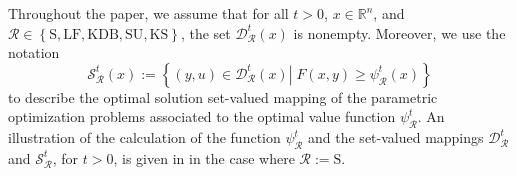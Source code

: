 Throughout the paper, we assume that for all $t>0$, $x\in \mathbb{R}^n$, and
$\mathcal{R}\in \left\{\mbox{S}, \mbox{LF}, \mbox{KDB}, \mbox{SU}, \mbox{KS}\right\}$, the set  $\mathcal{D}^{t}_{\mathcal{R}}(x)$ is nonempty. Moreover, we use the notation
\[
\mathcal{S}_{\mathcal{R}}^{t}(x):=\left\{  (y,u)\in\mathcal{D}^{t}_{\mathcal{R}}(x)\left\vert
\;F(x,y)\geq\psi_{\mathcal{R}}^{t}(x)\right.  \right\}
\]
to describe the optimal solution set-valued mapping of the parametric optimization problems associated to the optimal value function $\psi^t_{\mathcal{R}}$.
An illustration of the calculation of the function $\psi_{\mathcal{R}}^{t}$ and the set-valued mappings $\mathcal{D}^{t}_{\mathcal{R}}$ and $\mathcal{S}_{\mathcal{R}}^{t}$, for $t>0$, is given in \cite{BNZ} in the case where $\mathcal{R}:=\mbox{S}$.

